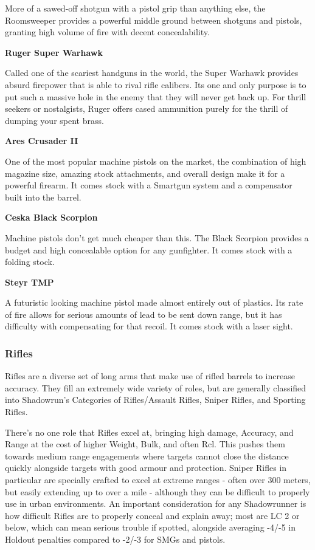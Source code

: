 \begin{mdframed}[linewidth=0pt]
\begin{multicols}{2}
		More of a sawed-off shotgun with a pistol grip than anything else, the Roomsweeper provides a powerful middle ground between shotguns and pistols, granting high volume of fire with decent concealability.
		
		\textbf{Ruger Super Warhawk}
		
		Called one of the scariest handguns in the world, the Super Warhawk provides absurd firepower that is able to rival rifle calibers. Its one and only purpose is to put such a massive hole in the enemy that they will never get back up. For thrill seekers or nostalgists, Ruger offers cased ammunition purely for the thrill of dumping your spent brass.
		
		\textbf{Ares Crusader II}
		
		One of the most popular machine pistols on the market, the combination of high magazine size, amazing stock attachments, and overall design make it for a powerful firearm. It comes stock with a Smartgun system and a compensator built into the barrel.
		
		\textbf{Ceska Black Scorpion}
		
		Machine pistols don't get much cheaper than this. The Black Scorpion provides a budget and high concealable option for any gunfighter. It comes stock with a folding stock.
		
		\textbf{Steyr TMP}
		
		A futuristic looking machine pistol made almost entirely out of plastics. Its rate of fire allows for serious amounts of lead to be sent down range, but it has difficulty with compensating for that recoil. It comes stock with a laser sight.
		
	\end{multicols}
\end{mdframed}

\subsubsection{Rifles}

Rifles are a diverse set of long arms that make use of rifled barrels to increase accuracy. They fill an extremely wide variety of roles, but are generally classified into Shadowrun's Categories of Rifles/Assault Rifles, Sniper Rifles, and Sporting Rifles.

There's no one role that Rifles excel at, bringing high damage, Accuracy, and Range at the cost of higher Weight, Bulk, and often Rcl. This pushes them towards medium range engagements where targets cannot close the distance quickly alongside targets with good armour and protection. Sniper Rifles in particular are specially crafted to excel at extreme ranges - often over 300 meters, but easily extending up to over a mile - although they can be difficult to properly use in urban environments. An important consideration for any Shadowrunner is how difficult Rifles are to properly conceal and explain away; most are LC 2 or below, which can mean serious trouble if spotted, alongside averaging -4/-5 in Holdout penalties compared to -2/-3 for SMGs and pistols.

